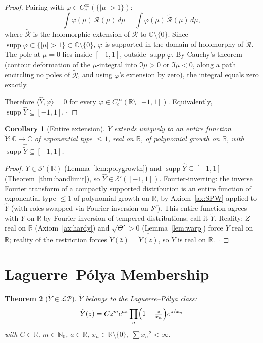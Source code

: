 \documentclass[11pt]{article}
\newtheorem{theorem}{Theorem}
\newtheorem{corollary}[theorem]{Corollary}
\theoremstyle{definition}
\newcommand{\R}{\mathbb{R}}
\newcommand{\C}{\mathbb{C}}
\newcommand{\N}{\mathbb{N}}
\newcommand{\supp}{\operatorname{supp}}
\newcommand{\LP}{\mathcal{LP}}
\begin{document}
\begin{proof}
Pairing with \(\varphi\in C_c^\infty(\{|\mu|>1\})\):
\[
\int\varphi(\mu)\,\mathcal R(\mu)\,d\mu=\int\varphi(\mu)\,\tilde{\mathcal R}(\mu)\,d\mu,
\]
where \(\tilde{\mathcal R}\) is the holomorphic extension of \(\mathcal R\) to \(\C\setminus\{0\}\). Since \(\supp\varphi\subset\{|\mu|>1\}\subset\C\setminus\{0\}\), \(\varphi\) is supported in the domain of holomorphy of \(\tilde{\mathcal R}\). The pole at \(\mu=0\) lies inside \([-1,1]\), outside \(\supp\varphi\). By Cauchy's theorem (contour deformation of the \(\mu\)-integral into \(\Im\mu>0\) or \(\Im\mu<0\), along a path encircling no poles of \(\tilde{\mathcal R}\), and using \(\varphi\)'s extension by zero), the integral equals zero exactly.


Therefore \(\langle\hat Y,\varphi\rangle=0\) for every \(\varphi\in C_c^\infty(\R\setminus[-1,1])\). Equivalently, \(\supp\hat Y\subseteq[-1,1]\). \(\square\)
\end{proof}

\begin{corollary}[Entire extension]\label{cor:entire}
\(Y\) extends uniquely to an entire function \(\tilde Y:\C\to\C\) of exponential type \(\le 1\), real on \(\R\), of polynomial growth on \(\R\), with \(\supp\hat{\tilde Y}\subseteq[-1,1]\).
\end{corollary}

\begin{proof}
\(Y\in\mathcal S'(\R)\) (Lemma~\ref{lem:polygrowth}) and \(\supp\hat Y\subseteq[-1,1]\) (Theorem~\ref{thm:bandlimit}), so \(\hat Y\in\mathcal E'([-1,1])\). Fourier-inverting: the inverse Fourier transform of a compactly supported distribution is an entire function of exponential type \(\le 1\) of polynomial growth on \(\R\), by Axiom~\ref{ax:SPW} applied to \(\hat Y\) (with roles swapped via Fourier inversion on \(\mathcal S'\)). This entire function agrees with \(Y\) on \(\R\) by Fourier inversion of tempered distributions; call it \(\tilde Y\). Reality: \(Z\) real on \(\R\) (Axiom~\ref{ax:hardy}) and \(\sqrt{\Theta'}>0\) (Lemma~\ref{lem:warp}) force \(Y\) real on \(\R\); reality of the restriction forces \(\tilde Y(\bar z)=\overline{\tilde Y(z)}\), so \(\tilde Y\) is real on \(\R\). \(\square\)
\end{proof}

\section{Laguerre--P\'olya Membership}

\begin{theorem}[\(\tilde Y\in\LP\)]\label{thm:LP}
\(\tilde Y\) belongs to the Laguerre--P\'olya class:
\[
\tilde Y(z)=Cz^m e^{az}\prod_n\Bigl(1-\tfrac{z}{x_n}\Bigr)e^{z/x_n}
\]
with \(C\in\R\), \(m\in\N_0\), \(a\in\R\), \(x_n\in\R\setminus\{0\}\), \(\sum x_n^{-2}<\infty\).
\end{theorem}
\end{document}
